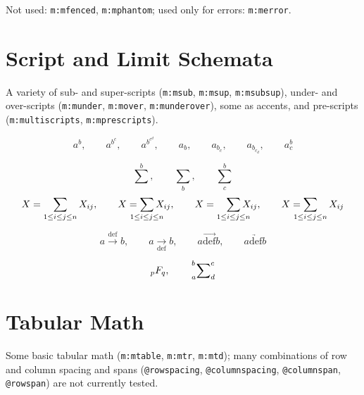 \documentclass{article}
\makeatletter
\newcommand{\mml}[1]{\texttt{m:#1}}
\newcommand{\attr}[1]{\texttt{@#1}}
\makeatother
\begin{document}
Not used: \mml{mfenced}, \mml{mphantom};
used only for errors: \mml{merror}.

\section{Script and Limit Schemata}
A variety of sub- and super-scripts (\mml{msub}, \mml{msup}, \mml{msubsup}),
under- and over-scripts (\mml{munder}, \mml{mover}, \mml{munderover}),
some as accents, and pre-scripts (\mml{multiscripts}, \mml{mprescripts}).

\begin{equation}
 a^{b},\qquad
 a^{b^{c}},\qquad
 a^{b^{c^{d}}},\qquad
 a_{b},\qquad
 a_{b_{c}},\qquad
 a_{b_{c_ {d}}},\qquad
 a^{b}_{c}
\end{equation}

\begin{equation}
 \sum^{b},\qquad
 \sum_{b},\qquad
 \sum^{b}_{c}
\end{equation}
\begin{equation}
X = \sum_{1\le i \le j \le n} X_{ij},\qquad
X = \sum_{\mathclap{1\le i \le j \le n}} X_{ij},\qquad
X = \smashoperator[r]{\sum_{1\le i \le j \le n}} X_{ij},\qquad
X = \smashoperator[l]{\sum_{1\le i \le j \le n}} X_{ij}
\end{equation}

\begin{equation}
 a \overset{\mathrm{def}}{\rightarrow} b, \qquad
 a \underset{\mathrm{def}}{\rightarrow} b,\qquad
 a \overrightarrow{\mathrm{def}} b,\qquad
 a \underrightarrow{\mathrm{def}} b
\end{equation}

\begin{equation}
 {}_p F_q,\qquad
 \sideset{_a^b}{^c_d}{\sum}
\end{equation}

\section{Tabular Math}
Some basic tabular math (\mml{mtable}, \mml{mtr}, \mml{mtd});
many combinations of row and column spacing and spans
(\attr{rowspacing}, \attr{columnspacing}, \attr{columnspan}, \attr{rowspan})
are not currently tested.
\end{document}
